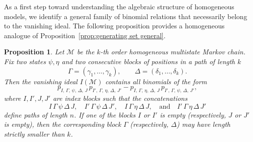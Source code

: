 \documentclass[11pt, a4paper]{article}
\numberwithin{equation}{section}
\theoremstyle{plain}
\newtheorem{proposition}[theorem]{Proposition}
\theoremstyle{definition}
\begin{document}
As a first step toward understanding the algebraic structure of homogeneous models,
we identify a general family of binomial relations that necessarily belong to the vanishing
ideal.
The following proposition provides a homogeneous analogue of
Proposition~\ref{prop:generating set general}.
  
\begin{proposition}
\label{prop:homogeneous binomials}
Let $\mathcal M$ be the $k$-th order homogeneous multistate Markov chain.
Fix two states $\psi,\eta$ and two consecutive blocks of positions in a path of length $k$
\[
\Gamma=(\gamma_1,\ldots,\gamma_k), \qquad
\Delta=(\delta_1,\ldots,\delta_k).
\]
Then the vanishing ideal $I(\mathcal M)$ contains all binomials of the form
\[
p_{I,\,\Gamma,\,\psi,\,\Delta,\,J}\,
p_{I',\,\Gamma,\,\eta,\,\Delta,\,J'}
-
p_{I,\,\Gamma,\,\eta,\,\Delta,\,J}\,
p_{I',\,\Gamma,\,\psi,\,\Delta,\,J'},
\]
where $I,I',J,J'$ are index blocks such that the concatenations
\[
I\,\Gamma\,\psi\,\Delta\,J,\quad
I'\,\Gamma\,\psi\,\Delta\,J',\quad
I\,\Gamma\,\eta\,\Delta\,J,\quad
\text{and}\quad
I'\,\Gamma\,\eta\,\Delta\,J'
\]
define paths of length $n$.
If one of the blocks $I$ or $I'$ is empty (respectively, $J$ or $J'$ is empty),
then the corresponding block $\Gamma$ (respectively, $\Delta$) 
may have length strictly smaller than $k$.
\end{proposition}
\end{document}
